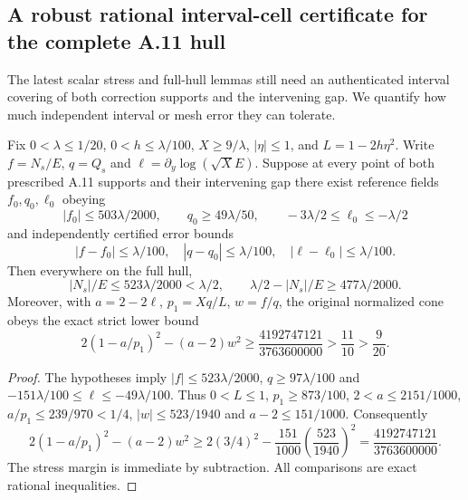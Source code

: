 \subsection*{A robust rational interval-cell certificate for the complete A.11 hull}
\label{subsec:a11-robust-cell-20261021}
The latest scalar stress and full-hull lemmas still need an authenticated
interval covering of both correction supports and the intervening gap.
We quantify how much independent interval or mesh error they can tolerate.

\begin{theorem}
\label{thm:a11-robust-hull-20261021}
Fix $0<\lambda\le1/20$, $0<h\le\lambda/100$,
$X\ge9/\lambda$, $|\eta|\le1$, and $L=1-2h\eta^2$.
Write $f=N_s/E$, $q=Q_s$ and
$\ell=\partial_y\log(\sqrt X E)$.
Suppose at every point of both prescribed A.11 supports and
their intervening gap there exist reference fields $f_0,q_0,\ell_0$
obeying
\[
 |f_0|\le503\lambda/2000,\qquad q_0\ge49\lambda/50,\qquad
 -3\lambda/2\le\ell_0\le-\lambda/2
\]
and independently certified error bounds
\[
 |f-f_0|\le\lambda/100,\quad
 |q-q_0|\le\lambda/100,\quad
 |\ell-\ell_0|\le\lambda/100.
\]
Then everywhere on the full hull,
\[
 |N_s|/E\le523\lambda/2000<\lambda/2,\qquad
 \lambda/2-|N_s|/E\ge477\lambda/2000.
\]
Moreover, with $a=2-2\ell$, $p_1=Xq/L$,
$w=f/q$, the original normalized cone obeys the
exact strict lower bound
\[
 2(1-a/p_1)^2-(a-2)w^2
 \ge\frac{4192747121}{3763600000}>\frac{11}{10}>\frac9{20}.
\]
\end{theorem}
\begin{proof}
The hypotheses imply
$|f|\le523\lambda/2000$, $q\ge97\lambda/100$
and $-151\lambda/100\le\ell\le-49\lambda/100$.
Thus $0<L\le1$, $p_1\ge873/100$,
$2<a\le2151/1000$, $a/p_1\le239/970<1/4$,
$|w|\le523/1940$ and $a-2\le151/1000$.
Consequently
\[
2(1-a/p_1)^2-(a-2)w^2
\ge2(3/4)^2-\frac{151}{1000}
 \left(\frac{523}{1940}\right)^2
=\frac{4192747121}{3763600000}.
\]
The stress margin is immediate by subtraction. All comparisons
are exact rational inequalities.
\end{proof}

